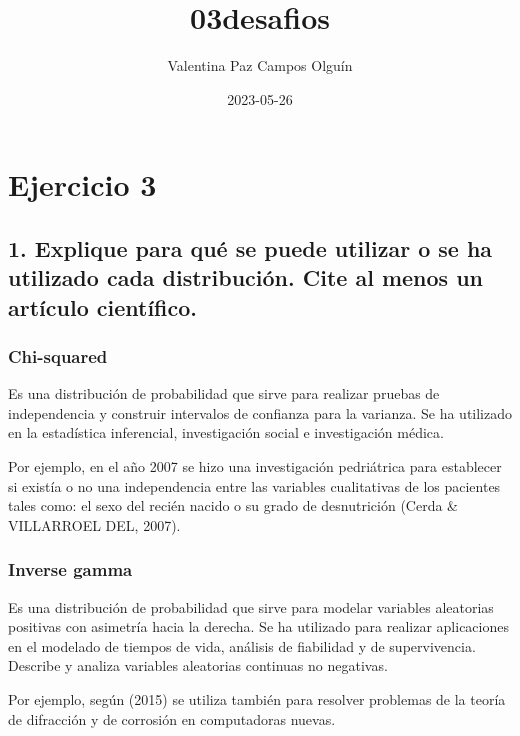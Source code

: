 \documentclass[
]{article}
\title{03desafios}
\author{Valentina Paz Campos Olguín}
\date{2023-05-26}
\begin{document}
\maketitle

\hypertarget{ejercicio-3}{%
\section{Ejercicio 3}\label{ejercicio-3}}

\hypertarget{explique-para-quuxe9-se-puede-utilizar-o-se-ha-utilizado-cada-distribuciuxf3n.-cite-al-menos-un-artuxedculo-cientuxedfico.}{%
\subsection{1. Explique para qué se puede utilizar o se ha utilizado
cada distribución. Cite al menos un artículo
científico.}\label{explique-para-quuxe9-se-puede-utilizar-o-se-ha-utilizado-cada-distribuciuxf3n.-cite-al-menos-un-artuxedculo-cientuxedfico.}}

\hypertarget{chi-squared}{%
\subsubsection{Chi-squared}\label{chi-squared}}

Es una distribución de probabilidad que sirve para realizar pruebas de
independencia y construir intervalos de confianza para la varianza. Se
ha utilizado en la estadística inferencial, investigación social e
investigación médica.

Por ejemplo, en el año 2007 se hizo una investigación pedriátrica para
establecer si existía o no una independencia entre las variables
cualitativas de los pacientes tales como: el sexo del recién nacido o su
grado de desnutrición (Cerda \& VILLARROEL DEL, 2007).

\hypertarget{inverse-gamma}{%
\subsubsection{Inverse gamma}\label{inverse-gamma}}

Es una distribución de probabilidad que sirve para modelar variables
aleatorias positivas con asimetría hacia la derecha. Se ha utilizado
para realizar aplicaciones en el modelado de tiempos de vida, análisis
de fiabilidad y de supervivencia. Describe y analiza variables
aleatorias continuas no negativas.

Por ejemplo, según (2015) se utiliza también para resolver problemas de
la teoría de difracción y de corrosión en computadoras nuevas.
\end{document}
